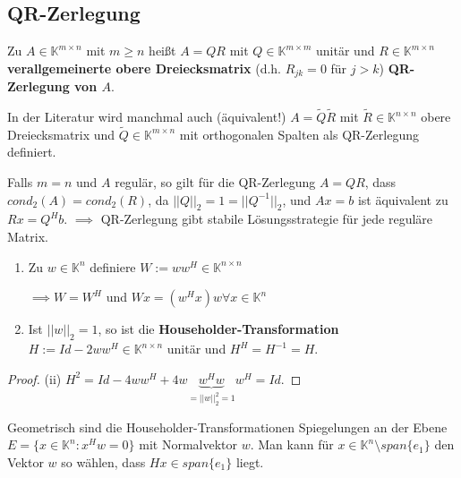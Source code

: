 \subsection{QR-Zerlegung}

\begin{definition}
	Zu $A \in \mathbb{K}^{m\times n}$ mit $m \geq n$ heißt $A=QR$ mit $Q\in \mathbb{K}^{m\times m}$ unitär und $R \in \mathbb{K}^{m\times n}$ \textbf{verallgemeinerte obere Dreiecksmatrix} (d.h. $R_{jk} = 0$ für $j > k$) \textbf{QR-Zerlegung von $A$}.
\end{definition}

\begin{remark}
	In der Literatur wird manchmal auch (äquivalent!) $A=\tilde{Q}\tilde{R}$ mit $\tilde{R} \in \mathbb{K}^{n\times n}$ obere Dreiecksmatrix und $\tilde{Q} \in \mathbb{K}^{m\times n}$ mit orthogonalen Spalten als QR-Zerlegung definiert.
\end{remark}

\begin{remark}
	Falls $m=n$ und $A$ regulär, so gilt für die QR-Zerlegung $A=QR$, dass $cond_2(A) = cond_2(R)$, da $||Q||_2 = 1 = ||Q^{-1}||_2$, und $Ax=b$ ist äquivalent zu $Rx = Q^Hb$. $\implies$ QR-Zerlegung gibt stabile Lösungsstrategie für jede reguläre Matrix.
\end{remark}

\begin{lemma}
	\begin{enumerate}
		\item Zu $w \in \mathbb{K}^n$ definiere $W:=ww^H \in \mathbb{K}^{n\times n}$
		
		$\implies W=W^H$ und $Wx=(w^Hx)w \forall x \in \mathbb{K}^n$
		
		\item Ist $||w||_2 = 1$, so ist die \textbf{Householder-Transformation} $H := Id - 2ww^H \in \mathbb{K}^{n\times n}$ unitär und $H^H = H^{-1} = H$.
	\end{enumerate}
\end{lemma}

\begin{proof}
	(ii) $H^2 = Id - 4ww^H + 4w\underbrace{w^Hw}_{=||w||_2^2=1}w^H = Id$.
\end{proof}

\begin{remark}
	Geometrisch sind die Householder-Transformationen Spiegelungen an der Ebene $E = \{x \in \mathbb{K}^n : x^Hw=0\}$ mit Normalvektor $w$. Man kann für $x \in \mathbb{K}^n\setminus span\{e_1\}$ den Vektor $w$ so wählen, dass $Hx \in span\{e_1\}$ liegt.
\end{remark}

